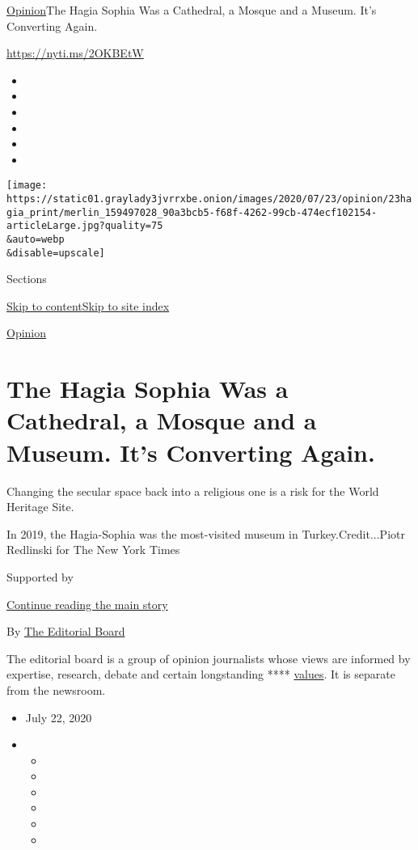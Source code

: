 \href{/section/opinion}{Opinion}\textbar{}The Hagia Sophia Was a
Cathedral, a Mosque and a Museum. It's Converting Again.

\url{https://nyti.ms/2OKBEtW}

\begin{itemize}
\item
\item
\item
\item
\item
\item
\end{itemize}

\texttt{[image: https://static01.graylady3jvrrxbe.onion/images/2020/07/23/opinion/23hagia\_print/merlin\_159497028\_90a3bcb5-f68f-4262-99cb-474ecf102154-articleLarge.jpg?quality=75\\\&auto=webp\\\&disable=upscale]}

Sections

\protect\hyperlink{site-content}{Skip to
content}\protect\hyperlink{site-index}{Skip to site index}

\href{/section/opinion}{Opinion}

\hypertarget{the-hagia-sophia-was-a-cathedral-a-mosque-and-a-museum-its-converting-again}{%
\section{The Hagia Sophia Was a Cathedral, a Mosque and a Museum. It's
Converting
Again.}\label{the-hagia-sophia-was-a-cathedral-a-mosque-and-a-museum-its-converting-again}}

Changing the secular space back into a religious one is a risk for the
World Heritage Site.

In 2019, the Hagia-Sophia was the most-visited museum in
Turkey.Credit...Piotr Redlinski for The New York Times

Supported by

\protect\hyperlink{after-sponsor}{Continue reading the main story}

By
\href{https://www.nytimes3xbfgragh.onion/interactive/opinion/editorialboard.html}{The
Editorial Board}

The editorial board is a group of opinion journalists whose views are
informed by expertise, research, debate and certain longstanding ****
\href{https://www.nytimes3xbfgragh.onion/interactive/2018/opinion/editorialboard.html?module=inline}{values}.
It is separate from the newsroom.

\begin{itemize}
\item
  July 22, 2020
\item
  \begin{itemize}
  \item
  \item
  \item
  \item
  \item
  \item
  \end{itemize}
\end{itemize}

